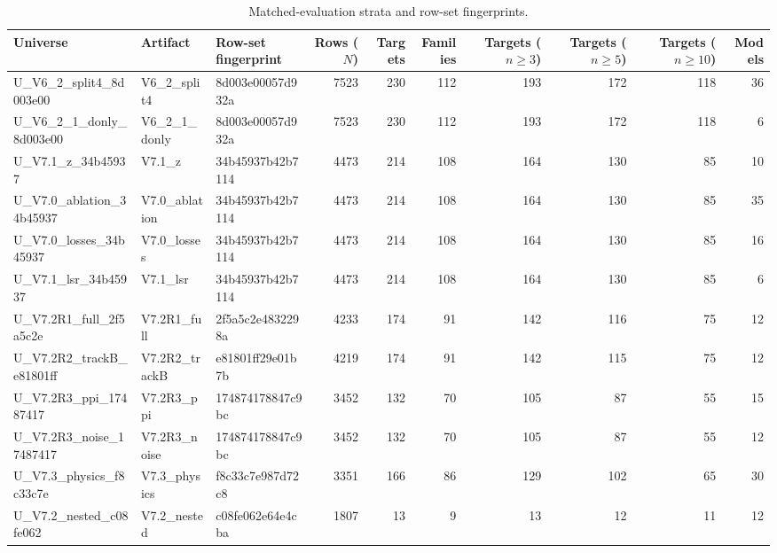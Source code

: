 \documentclass[11pt,a4paper]{article}
\begin{document}
\begin{landscape}
\begin{table}[h]
  \centering
  \scriptsize
  \begin{threeparttable}
  \caption{Matched-evaluation strata and row-set fingerprints.}
  \label{tab:s1}
  \begin{tabular}{@{}lllrrrrrrr@{}}
    \toprule
    Universe & Artifact & Row-set fingerprint & Rows ($N$) & Targets & Families
      & Targets ($n \geq 3$) & Targets ($n \geq 5$) & Targets ($n \geq 10$) & Models \\
    \midrule
U\_V6\_2\_split4\_8d003e00 & V6\_2\_split4 & 8d003e00057d932a & 7523 & 230 & 112 & 193 & 172 & 118 & 36 \\
U\_V6\_2\_1\_donly\_8d003e00 & V6\_2\_1\_donly & 8d003e00057d932a & 7523 & 230 & 112 & 193 & 172 & 118 & 6 \\
U\_V7.1\_z\_34b45937 & V7.1\_z & 34b45937b42b7114 & 4473 & 214 & 108 & 164 & 130 & 85 & 10 \\
U\_V7.0\_ablation\_34b45937 & V7.0\_ablation & 34b45937b42b7114 & 4473 & 214 & 108 & 164 & 130 & 85 & 35 \\
U\_V7.0\_losses\_34b45937 & V7.0\_losses & 34b45937b42b7114 & 4473 & 214 & 108 & 164 & 130 & 85 & 16 \\
U\_V7.1\_lsr\_34b45937 & V7.1\_lsr & 34b45937b42b7114 & 4473 & 214 & 108 & 164 & 130 & 85 & 6 \\
U\_V7.2R1\_full\_2f5a5c2e & V7.2R1\_full & 2f5a5c2e4832298a & 4233 & 174 & 91 & 142 & 116 & 75 & 12 \\
U\_V7.2R2\_trackB\_e81801ff & V7.2R2\_trackB & e81801ff29e01b7b & 4219 & 174 & 91 & 142 & 115 & 75 & 12 \\
U\_V7.2R3\_ppi\_17487417 & V7.2R3\_ppi & 174874178847c9bc & 3452 & 132 & 70 & 105 & 87 & 55 & 15 \\
U\_V7.2R3\_noise\_17487417 & V7.2R3\_noise & 174874178847c9bc & 3452 & 132 & 70 & 105 & 87 & 55 & 12 \\
U\_V7.3\_physics\_f8c33c7e & V7.3\_physics & f8c33c7e987d72c8 & 3351 & 166 & 86 & 129 & 102 & 65 & 30 \\
U\_V7.2\_nested\_c08fe062 & V7.2\_nested & c08fe062e64e4cba & 1807 & 13 & 9 & 13 & 12 & 11 & 12 \\
    \bottomrule
  \end{tabular}
  \end{threeparttable}
\end{table}
\end{landscape}
\end{document}
